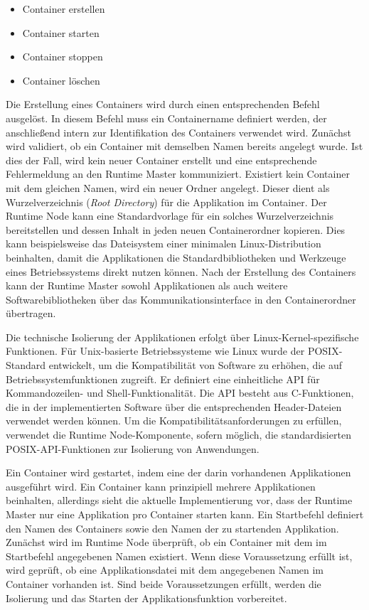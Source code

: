 \begin{itemize}
    \item Container erstellen
    \item Container starten
    \item Container stoppen
    \item Container löschen
\end{itemize}

Die Erstellung eines Containers wird durch einen entsprechenden Befehl ausgelöst. In diesem Befehl muss ein Containername definiert werden, der anschließend intern zur Identifikation des Containers verwendet wird. Zunächst wird validiert, ob ein Container mit demselben Namen bereits angelegt wurde. Ist dies der Fall, wird kein neuer Container erstellt und eine entsprechende Fehlermeldung an den Runtime Master kommuniziert. Existiert kein Container mit dem gleichen Namen, wird ein neuer Ordner angelegt. Dieser dient als Wurzelverzeichnis (\textit{Root Directory}) für die Applikation im Container. Der Runtime Node kann eine Standardvorlage für ein solches Wurzelverzeichnis bereitstellen und dessen Inhalt in jeden neuen Containerordner kopieren. Dies kann beispielsweise das Dateisystem einer minimalen Linux-Distribution beinhalten, damit die Applikationen die Standardbibliotheken und Werkzeuge eines Betriebssystems direkt nutzen können. Nach der Erstellung des Containers kann der Runtime Master sowohl Applikationen als auch weitere Softwarebibliotheken über das Kommunikationsinterface in den Containerordner übertragen.

Die technische Isolierung der Applikationen erfolgt über Linux-Kernel-spezifische Funktionen. Für Unix-basierte Betriebssysteme wie Linux wurde der \gls{POSIX}-Standard entwickelt, um die Kompatibilität von Software zu erhöhen, die auf Betriebssystemfunktionen zugreift. Er definiert eine einheitliche \gls{API} für Kommandozeilen- und Shell-Funktionalität. Die \gls{API} besteht aus C-Funktionen, die in der implementierten Software über die entsprechenden Header-Dateien verwendet werden können. Um die Kompatibilitätsanforderungen zu erfüllen, verwendet die Runtime Node-Komponente, sofern möglich, die standardisierten \gls{POSIX}-\gls{API}-Funktionen zur Isolierung von Anwendungen.

Ein Container wird gestartet, indem eine der darin vorhandenen Applikationen ausgeführt wird. Ein Container kann prinzipiell mehrere Applikationen beinhalten, allerdings sieht die aktuelle Implementierung vor, dass der Runtime Master nur eine Applikation pro Container starten kann. Ein Startbefehl definiert den Namen des Containers sowie den Namen der zu startenden Applikation. Zunächst wird im Runtime Node überprüft, ob ein Container mit dem im Startbefehl angegebenen Namen existiert. Wenn diese Voraussetzung erfüllt ist, wird geprüft, ob eine Applikationsdatei mit dem angegebenen Namen im Container vorhanden ist. Sind beide Voraussetzungen erfüllt, werden die Isolierung und das Starten der Applikationsfunktion vorbereitet. 

